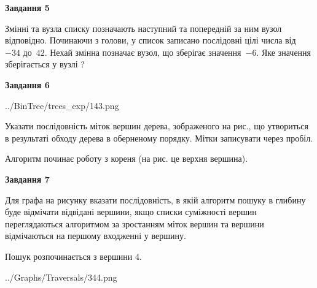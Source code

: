 \documentclass[12pt, ukrainian]{article}
\begin{document}
{\begin {large}
{\begin {center}\textbf{Завдання 5}\end {center}}\par
Змінні  та  вузла списку позначають наступний та попередній за ним вузол відповідно. Починаючи з голови, у список записано послідовні цілі числа від~$-34$ до~$42$. Нехай змінна  позначає вузол, що зберігає значення~$-6$.
Яке значення зберігається у вузлі  ?\par
\newpage

{\begin {center}\textbf{Завдання 6}\end {center}}\par

\begin{center}
	{../BinTree/trees_exp/143.png}
\end{center}
Указати послідовність міток вершин дерева, зображеного на рис., що утвориться в результаті обходу дерева в оберненому порядку. Мітки записувати через пробіл.\par Алгоритм починає роботу з кореня (на рис. це верхня вершина).\par
\newpage

{\begin {center}\textbf{Завдання 7}\end {center}}\par
Для графа на рисунку вказати послідовність, в якій алгоритм пошуку в глибину буде відмічати відвідані вершини, якщо списки суміжності вершин переглядаються алгоритмом за зростанням міток вершин та вершини відмічаються на першому вход\-женні у вершину.\par
Пошук розпочинається з вершини 4.\par

\begin{center}
	{../Graphs/Traversals/344.png}
\end{center}\par
\newpage


\end{large}}
\end{document}
